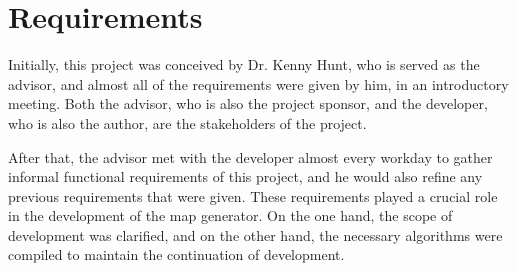 \section{Requirements}
\label{sec:Requirements}
Initially, this project was conceived by Dr. Kenny Hunt, who is served as the advisor, and almost all of the requirements were given by him, in an introductory meeting. Both the advisor, who is also the project sponsor, and the developer, who is also the author, are the stakeholders of the project.

After that, the advisor met with the developer almost every workday to gather informal functional requirements of this project, and he would also refine any previous requirements that were given. These requirements played a crucial role in the development of the map generator. On the one hand, the scope of development was clarified, and on the other hand, the necessary algorithms were compiled to maintain the continuation of development.


